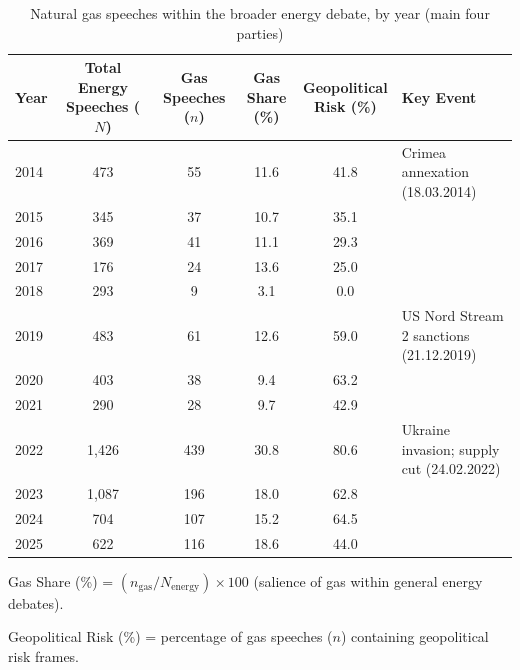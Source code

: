 \begin{table}[t]
    \centering
    \small
    \begin{threeparttable}
    \begin{tabularx}{\linewidth}{l c c c c >{\raggedright\arraybackslash}X}
        \toprule
        Year & \makecell{Total Energy\\Speeches ($N$)} & \makecell{Gas Speeches\\($n$)} & \makecell{Gas Share\\(\%)\tnote{a}} & \makecell{Geopolitical\\Risk (\%)\tnote{b}} & Key Event \\
        \midrule
        2014 & 473 & 55 & 11.6 & 41.8 & Crimea annexation (18.03.2014) \\
        2015 & 345 & 37 & 10.7 & 35.1 &  \\
        2016 & 369 & 41 & 11.1 & 29.3 &  \\
        2017 & 176 & 24 & 13.6 & 25.0 &  \\
        2018 & 293 & 9 & 3.1 & 0.0 &  \\
        2019 & 483 & 61 & 12.6 & 59.0 & US Nord Stream 2 sanctions (21.12.2019) \\
        2020 & 403 & 38 & 9.4 & 63.2 &  \\
        2021 & 290 & 28 & 9.7 & 42.9 &  \\
        2022 & 1{,}426 & 439 & 30.8 & 80.6 & Ukraine invasion; supply cut (24.02.2022) \\
        2023 & 1{,}087 & 196 & 18.0 & 62.8 &  \\
        2024 & 704 & 107 & 15.2 & 64.5 &  \\
        2025 & 622 & 116 & 18.6 & 44.0 &  \\
        \bottomrule
    \end{tabularx}
    \begin{tablenotes}
        \footnotesize
        \item{} Gas Share (\%) = $(n_{\text{gas}} / N_{\text{energy}}) \times 100$ (salience of gas within general energy debates).
        \item{} Geopolitical Risk (\%) = percentage of gas speeches ($n$) containing geopolitical risk frames.
    \end{tablenotes}
    \caption{Natural gas speeches within the broader energy debate, by year (main four parties)}
    \label{tab:geo_gas}
    \end{threeparttable}
\end{table}
